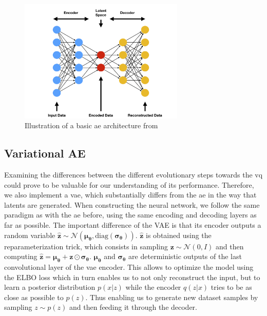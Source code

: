\begin{figure}[H]
    \centering
    \includegraphics[width=0.7\textwidth]{images/ae}
    \caption{Illustration of a basic \ac{ae} architecture from~\cite{ae_pic}}
    \label{fig:ae}
\end{figure}

\subsection{Variational AE}\label{subsec:variational-ae}
Examining the differences between the different evolutionary steps towards the \ac{vq} could prove to be valuable
for our understanding of its performance.
Therefore, we also implement a \ac{vae}, which substantially differs from the \ac{ae} in the way that latents are
generated.
When constructing the neural network, we follow the same paradigm as with the \ac{ae} before, using the same
encoding and decoding layers as far as possible.
The important difference of the VAE is that its encoder outputs a random variable
$\boldsymbol{\hat{z}} \sim \mathcal{N}(\boldsymbol{\mu_\theta}, \text{diag}
(\boldsymbol{\sigma_\theta}))$. $\boldsymbol{\hat{z}}$ is obtained using the
reparameterization trick, which consists in sampling $\boldsymbol{z}
\sim \mathcal{N}(0, I)$ and then computing $\boldsymbol{\hat{z}} =
\boldsymbol{\mu_\theta} + \boldsymbol{z} \odot \boldsymbol{\sigma_\theta}$.
$\boldsymbol{\mu_\theta}$ and $\boldsymbol{\sigma_\theta}$ are deterministic
outputs of the last convolutional layer of the \ac{vae} encoder.
This allows to optimize the model using the ELBO loss which in turn enables us to not only
reconstruct the input, but to learn a posterior distribution $p(x|z)$ while
the encoder $q(z|x)$ tries to be as close as possible to $p(z)$.
Thus enabling us to generate new dataset samples by sampling $z \sim p(z)$ and then feeding
it through the decoder.

